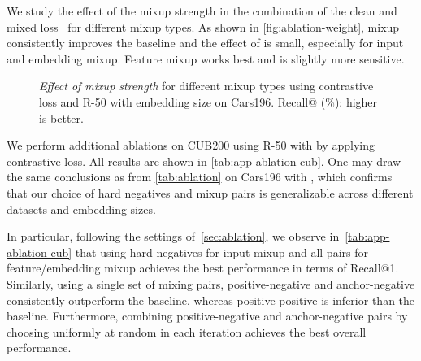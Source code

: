 \documentclass{article}
\makeatletter
\newcommand{\leg}[1]{\addlegendentry{#1}}
\renewcommand\paragraph{\@startsection{paragraph}{4}{\z@}{1ex}{-1em}{\normalfont\normalsize\bfseries}}
\makeatother
\begin{document}
We study the effect of the mixup strength  in the combination of the clean and mixed loss~ for different mixup types. As shown in \autoref{fig:ablation-weight}, mixup consistently improves the baseline and the effect of  is small, especially for input and embedding mixup. Feature mixup works best and is slightly more sensitive.

\begin{figure}
\centering
{}
\caption{\emph{Effect of mixup strength} for different mixup types using contrastive loss and R-50 with embedding size  on Cars196. Recall@ (\%): higher is better.}
\label{fig:ablation-weight}
\end{figure}

\paragraph{Ablation on CUB200}
We perform additional ablations on CUB200 using R-50 with  by applying contrastive loss. All results are shown in \autoref{tab:app-ablation-cub}. One may draw the same conclusions as from \autoref{tab:ablation} on Cars196 with , which confirms that our choice of hard negatives and mixup pairs is generalizable across different datasets and embedding sizes.

In particular, following the settings of~\autoref{sec:ablation}, we observe in~\autoref{tab:app-ablation-cub} that using  hard negatives for input mixup and all pairs for feature/embedding mixup achieves the best performance in terms of Recall@1. Similarly, using a single set of mixing pairs, positive-negative and anchor-negative consistently outperform the baseline, whereas positive-positive is inferior than the baseline. Furthermore, combining positive-negative and anchor-negative pairs by choosing uniformly at random in each iteration achieves the best overall performance.
\end{document}
